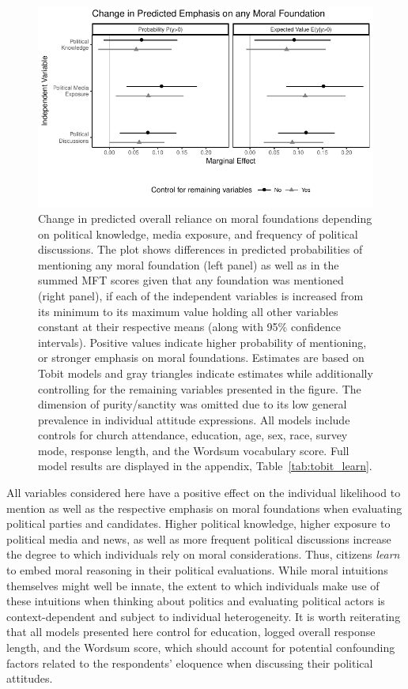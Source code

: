 \documentclass[12pt]{article}
\begin{document}
\begin{figure}[h]\centering
\includegraphics{../calc/fig/tobit_learn.pdf}
\caption{Change in predicted overall reliance on moral foundations depending on political knowledge, media exposure, and frequency of political discussions. The plot shows differences in predicted probabilities of mentioning any moral foundation (left panel) as well as in the summed MFT scores given that any foundation was mentioned (right panel), if each of the independent variables is increased from its minimum to its maximum value holding all other variables constant at their respective means (along with 95\% confidence intervals). Positive values indicate higher probability of mentioning, or stronger emphasis on moral foundations. Estimates are based on Tobit models and gray triangles indicate estimates while additionally controlling for the remaining variables presented in the figure. The dimension of purity/sanctity was omitted due to its low general prevalence in individual attitude expressions. All models include controls for church attendance, education, age, sex, race, survey mode, response length, and the Wordsum vocabulary score. Full model results are displayed in the appendix, Table~\ref{tab:tobit_learn}.
}\label{fig:tobit_learn}
\end{figure}

All variables considered here have a positive effect on the individual likelihood to mention as well as the respective emphasis on moral foundations when evaluating political parties and candidates. Higher political knowledge, higher exposure to political media and news, as well as more frequent political discussions increase the degree to which individuals rely on moral considerations. Thus, citizens \textit{learn} to embed moral reasoning in their political evaluations. While moral intuitions themselves might well be innate, the extent to which individuals make use of these intuitions when thinking about politics and evaluating political actors is context-dependent and subject to individual heterogeneity. It is worth reiterating that all models presented here control for education, logged overall response length, and the Wordsum score, which should account for potential confounding factors related to the respondents' eloquence when discussing their political attitudes.
\end{document}
